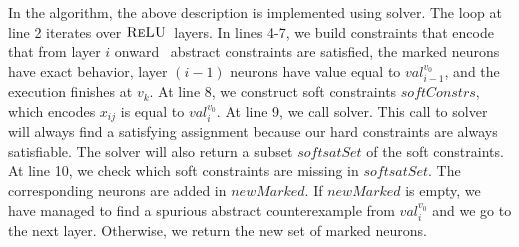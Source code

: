 In the algorithm, the above description is implemented using \maxsat{} solver.
The loop at line 2 iterates over $\textsc{ReLU}${}~layers.
In lines 4-7, we build constraints that encode that from layer $i$ onward
\deeppoly~abstract constraints are satisfied,
the marked neurons have exact behavior, layer $(i-1)$ neurons have value equal to
${val_{i-1}^{v_0}}$, and the execution finishes at $v_k$.
At line 8, we construct soft constraints $softConstrs$, which encodes $x_{ij}$ is equal to $val_{i}^{v_0}$.
At line 9, we call \maxsat{} solver. 
This call to \maxsat{} solver will always find a satisfying assignment because
our hard constraints are always satisfiable.
The solver will also return a subset $softsatSet$ of the soft constraints.
At line 10, we check which soft constraints are missing in $softsatSet$.
The corresponding neurons are added in $newMarked$.
If $newMarked$ is empty, we have managed to find a spurious
abstract counterexample from $val^{v_0}_{i}$ and we go to the next layer.
Otherwise, we return the new set of marked neurons.




















